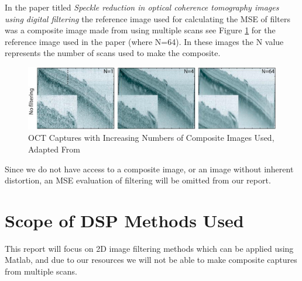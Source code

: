 \documentclass[%
reprint,
showpacs,preprintnumbers,
bibnotes,
amsmath,amssymb,
aps,
pra,
]{revtex4-1}
\begin{document}
	  	In the paper titled \textit{Speckle reduction in optical coherence tomography images using digital filtering} \cite{ozcan_speckle_2007} the reference image used for calculating the MSE of filters was a composite image made from using multiple scans see Figure \ref{fig:Composite} for the reference image used in the paper (where N=64). In these images the N value represents the number of scans used to make the composite.
	
	  	\begin{figure}
	    	\centering
	    	\includegraphics[width=0.8\linewidth]{Figures/composite}
	    	\caption{OCT Captures with Increasing Numbers of Composite Images Used, Adapted From \cite{ozcan_speckle_2007}}
	    	\label{fig:Composite}
	 	\end{figure}
	
	  	Since we do not have access to a composite image, or an image without inherent distortion, an MSE evaluation of filtering will be omitted from our report.
	\section{\label{sec:level1} Scope of DSP Methods Used}

	This report will focus on 2D image filtering methods which can be applied using Matlab, and due to our resources we will not be able to make composite captures from multiple scans.
	
\end{document}
